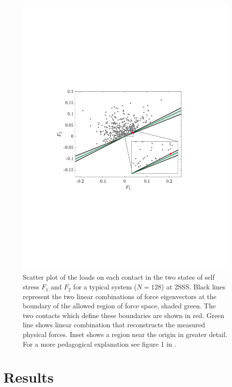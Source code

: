 \begin{figure}[t!]
\includegraphics[width=\columnwidth, trim=99 240 136 255, clip]{contactBreakingPaper/forceSpace.pdf}
\caption{Scatter plot of the loads on each contact in the two states of self stress $F_1$ and $F_2$ for a typical system ($N=128$) at 2SSS. Black lines represent the two linear combinations of force eigenvectors at the boundary of the allowed region of force space, shaded green. The two contacts which define these boundaries are shown in red. Green line shows linear combination that reconstructs the measured physical forces. Inset shows a region near the origin in greater detail. For a more pedagogical explanation see figure 1 in \cite{sartor_direct_2020}.}
\label{plot:fig1}
\end{figure}


\section{Results}


